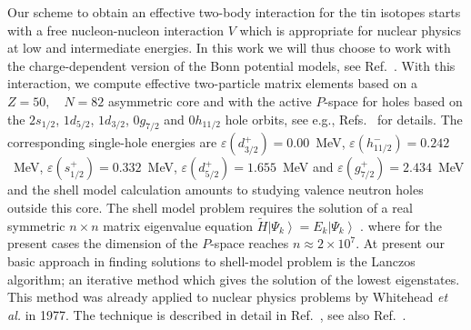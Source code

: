 Our scheme to obtain an effective two-body interaction for 
the tin isotopes
starts with a free nucleon-nucleon  interaction $V$ which is
appropriate for nuclear physics at low and intermediate energies. 
In this work we will thus choose to work with the charge-dependent
version of the Bonn potential models, see \mbox{Ref. \cite{cdbonn}}.
With this interaction, we compute  
effective two-particle matrix elements based on 
a $Z = 50, \quad N = 82$ asymmetric core and with the active $P$-space for holes
based on the $2s_{1/2}$, $1d_{5/2}$, $1d_{3/2}$, $0g_{7/2}$ and $0h_{11/2}$
hole orbits, see e.g., Refs.~\cite{hko95,ehho97} for details.
The corresponding single-hole energies are
$\varepsilon(d_{3/2}^{+}) = 0.00$~MeV, 
 $\varepsilon(h_{11/2}^{-}) = 0.242$~MeV, $\varepsilon(s_{1/2}^{+}) = 0.332$~MeV,
$\varepsilon(d_{5/2}^{+}) = 1.655$~MeV and  $\varepsilon(g_{7/2}^{+}) = 2.434$~MeV
and the shell model calculation amounts to studying
valence neutron holes outside this core.
The shell model problem requires the solution of a real symmetric
$n \times n$ matrix eigenvalue equation
$\widetilde{H}\left | \Psi_k\right\rangle  = E_k \left | \Psi_k\right\rangle$ .
where for the present cases the dimension of the $P$-space reaches $n \approx 2 \times 10^{7}$.
At present our basic approach in finding solutions to shell-model problem
is the Lanczos algorithm; an iterative method
which gives the solution of the lowest eigenstates. This method was 
already applied to nuclear physics problems by Whitehead {\sl et al.} 
in 1977. The technique is described in detail in Ref.\ \cite{whit77}, 
see also Ref.\ \cite{ehho95}. 

